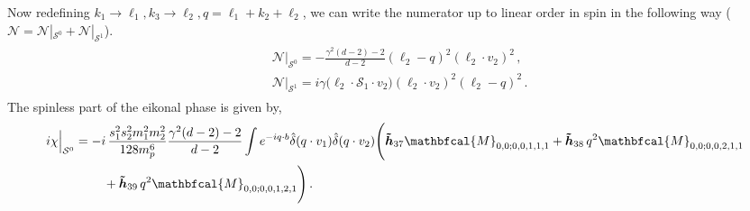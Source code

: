 Now redefining $k_1\to \ell_{1}, k_3\to \ell_{2}, q=\ell_{1}+k_2+\ell_{2}$, we can write the numerator up to linear order in spin in the following way ($\mathcal{N}= \mathcal{N}|_{\mathcal{S}^0}+ \mathcal{N}|_{\mathcal{S}^1}$).
\begin{align}
    \begin{split}
    &   \mathcal{N}\Big|_{\mathcal{S}^0}= -\frac{\gamma^2(d-2)-2}{d-2}(\ell_2-q)^2(\ell_2\cdot v_2)^2\,,\\ &
     \mathcal{N}\Big|_{\mathcal{S}^1}=i\gamma \Big(\ell_2\cdot \mathcal{S}_1\cdot v_2\Big)(\ell_2\cdot v_2)^2(\ell_2-q)^2\,.
    \end{split}
\end{align}
The spinless part of the eikonal phase is given by,
\begin{align}
    \begin{split}
        i\chi\Big|_{\mathcal{S}^0}&
        =-i\,\frac{s_1^2 s_2^2 m_1^2 m_2^2} {128 m_p^6} \frac{\gamma^2(d-2)-2}{d-2}\int e^{-iq\cdot b}\hat\delta(q\cdot v_1)\hat\delta(q\cdot v_2)\Bigg(\boldsymbol{\tilde h}_{37}\mathbfcal{M}_{0,0;0,0,1,1,1}+\boldsymbol{\tilde h}_{38}\,q^2\mathbfcal{M}_{0,0;0,0,2,1,1}\\ &\hspace{0.8cm}+\boldsymbol{\tilde h}_{39}\,q^2\mathbfcal{M}_{0,0;0,0,1,2,1}\Bigg)\,.
    \end{split}
\end{align}
